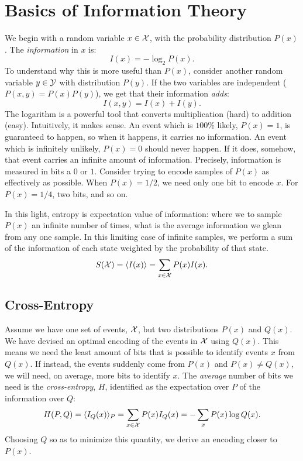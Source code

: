 \chapter{Basics of Information Theory}\label{sec:information-theory}
We begin with a random variable $x\in \mathcal{X}$, with the probability
distribution $P(x)$.  The \textit{information} in $x$ is:
\begin{equation}%
  I(x)=-\log_2 P(x).
\end{equation}%
To understand why this is more useful than $P(x)$, consider another
random variable $y\in \mathcal{Y}$ with distribution $P(y)$. If the two
variables are independent ($P(x,y)=P(x)P(y)$), we get that their
information \textit{adds}:
\begin{equation}%
  I(x,y)=I(x)+I(y).
\end{equation}%
The logarithm is a powerful tool that converts multiplication (hard)
to addition (easy). Intuitively, it makes sense. An event which is $100\%$ likely,
$P(x)=1$, is guaranteed to happen, so when it happens, it carries no information.
An event which is infinitely unlikely, $P(x)=0$ should never happen. If it does, somehow,
that event carries an infinite amount of information. Precisely, information is measured in
bits a $0$ or $1$. Consider trying to encode samples of $P(x)$ as effectively as possible.
When $P(x)=1/2$, we need only one bit to encode $x$. For $P(x)=1/4$, two bits, and so on.

In this light, entropy is expectation value of information: where we to sample $P(x)$ an infinite
number of times, what is the average information we glean from any one sample. In this limiting
case of infinite samples, we perform a sum of the information of each state weighted by the probability of that state.
\begin{equation}%
S(\mcX)=\expect{I(x)}=\sum_{x\in\mcX}P(x)I(x).\label{eq:entropy-info}
\end{equation}%
\section{Cross-Entropy}\label{sec:cross-entropy}
Assume we have one set of events, $\mathcal{X}$, but two distributions $P(x)$ and $Q(x)$. We
have devised an optimal encoding of the events in $\mathcal{X}$ using $Q(x)$. This means
we need the least amount of bits that is possible to identify events $x$ from $Q(x)$.
If instead, the events suddenly come from $P(x)$ and $P(x)\neq Q(x)$, we will need,
on average, more bits to identify $x$. The \textit{average} number of bits we need is
the \textit{cross-entropy}, $H$, identified
as the expectation over $P$ of the information over $Q$:
\begin{equation}%
H(P,Q)=\expect{I_Q(x)}_P=\sum_{x\in\mcX} P(x)I_Q(x)=-\sum_{x}P(x)\log Q(x).\label{eq:cross-entropy-info}
\end{equation}%
Choosing $Q$ so as to minimize this quantity, we derive an encoding closer to $P(x)$.

